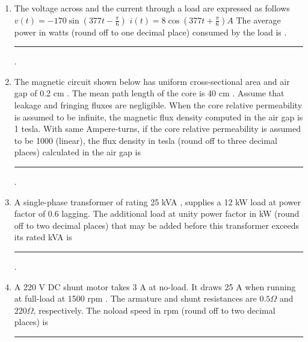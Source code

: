 \documentclass[journal]{IEEEtran}
\begin{document}
\begin{enumerate}
    

 
    \item  The voltage across and the current through a load are expressed as follows
$v(t)=-170 \sin (377 t-\frac{\pi}{6}) $
$i(t)=8 \cos (377 t+\frac{\pi}{6}) {A}$
The average power in watts (round off to one decimal place) consumed by the load is
.\rule{1cm}{0.15mm}.
\hfill{}
 
  \item  The magnetic circuit shown below has uniform cross-sectional area and air gap of 0.2 cm . The mean path length of the core is 40 cm . Assume that leakage and fringing fluxes are negligible. When the core relative permeability is assumed to be infinite, the magnetic flux density computed in the air gap is 1 tesla. With same Ampere-turns, if the core relative permeability is assumed to be 1000 (linear), the flux density in tesla (round off to three decimal places) calculated in the air gap is \rule{1cm}{0.15mm}.
  
  \hfill{}

 
  
  \item  A single-phase transformer of rating 25 kVA , supplies a 12 kW load at power factor of 0.6 lagging. The additional load at unity power factor in kW (round off to two decimal places) that may be added before this transformer exceeds its rated kVA is \rule{1cm}{0.15mm}.
\hfill{}

\item A 220 V DC shunt motor takes 3 A at no-load. It draws 25 A when running at full-load at 1500 rpm . The armature and shunt resistances are $0.5 \Omega$ and $220 \Omega$, respectively. The noload speed in rpm (round off to two decimal places) is \rule{1cm}{0.15mm} 
    \hfill{}
    

\end{enumerate}
\end{document}

